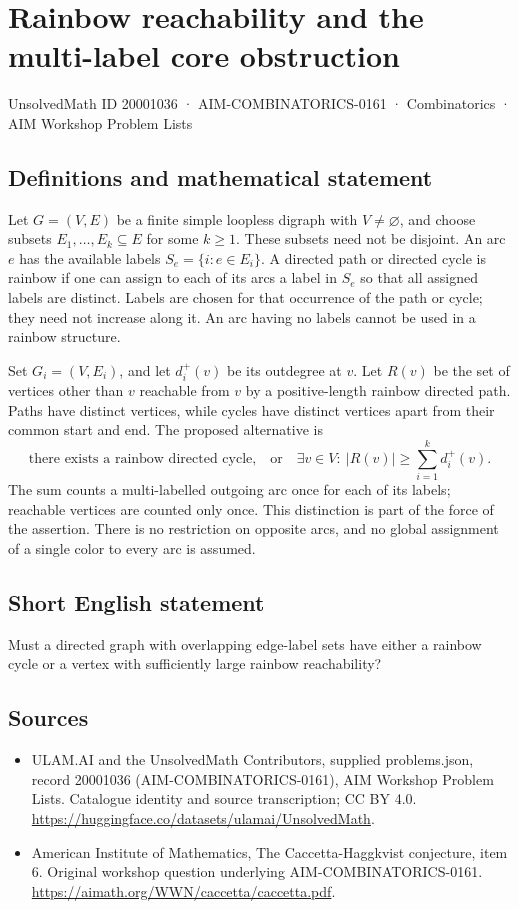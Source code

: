 \documentclass[11pt,a4paper]{article}
\begin{document}
\section*{Rainbow reachability and the multi-label core obstruction}\label{20001036}
{\small UnsolvedMath ID 20001036 · AIM-COMBINATORICS-0161 · Combinatorics · AIM Workshop Problem Lists}
\subsection{Definitions and mathematical statement}
Let $G=(V,E)$ be a finite simple loopless digraph with $V\ne\varnothing$,
and choose subsets $E_1,\ldots,E_k\subseteq E$ for some $k\ge1$.
These subsets need not be disjoint. An arc $e$ has the available labels
$S_e=\{i:e\in E_i\}$. A directed path or directed cycle is rainbow
if one can assign to each of its arcs a label in $S_e$ so that all
assigned labels are distinct. Labels are chosen for that occurrence
of the path or cycle; they need not increase along it.
An arc having no labels cannot be used in a rainbow structure.

Set $G_i=(V,E_i)$, and let $d_i^+(v)$ be its outdegree at $v$.
Let $R(v)$ be the set of vertices other than $v$ reachable from $v$
by a positive-length rainbow directed path. Paths have distinct
vertices, while cycles have distinct vertices apart from their common
start and end. The proposed alternative is
\[
 \text{there exists a rainbow directed cycle,}
 \quad\text{or}\quad
 \exists v\in V:\ |R(v)|\ge\sum_{i=1}^k d_i^+(v).
\]
The sum counts a multi-labelled outgoing arc once for each of its
labels; reachable vertices are counted only once. This distinction
is part of the force of the assertion. There is no restriction on
opposite arcs, and no global assignment of a single color to every
arc is assumed.
\subsection{Short English statement}
Must a directed graph with overlapping edge-label sets have either a rainbow cycle or a vertex with sufficiently large rainbow reachability?
\subsection{Sources}
\begin{itemize}
\item[S1] ULAM.AI and the UnsolvedMath Contributors, supplied problems.json, record 20001036 (AIM-COMBINATORICS-0161), AIM Workshop Problem Lists. Catalogue identity and source transcription; CC BY 4.0.
\url{https://huggingface.co/datasets/ulamai/UnsolvedMath}.
\item[S2] American Institute of Mathematics, The Caccetta-Haggkvist conjecture, item 6. Original workshop question underlying AIM-COMBINATORICS-0161.
\url{https://aimath.org/WWN/caccetta/caccetta.pdf}.
\end{itemize}
\end{document}
